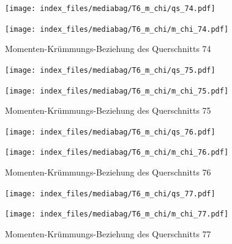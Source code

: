 \documentclass[
  11pt,
  letterpaper,
]{scrreprt}
\begin{document}
\begin{figure}[H]

\begin{minipage}{0.50\linewidth}
\texttt{[image: index\_files/mediabag/T6\_m\_chi/qs\_74.pdf]}\end{minipage}%
%
\begin{minipage}{0.50\linewidth}
\texttt{[image: index\_files/mediabag/T6\_m\_chi/m\_chi\_74.pdf]}\end{minipage}%

\caption{\label{fig-mchi_anhang}Momenten-Krümmungs-Beziehung des
Querschnitts 74}

\end{figure}%

\begin{figure}[H]

\begin{minipage}{0.50\linewidth}
\texttt{[image: index\_files/mediabag/T6\_m\_chi/qs\_75.pdf]}\end{minipage}%
%
\begin{minipage}{0.50\linewidth}
\texttt{[image: index\_files/mediabag/T6\_m\_chi/m\_chi\_75.pdf]}\end{minipage}%

\caption{\label{fig-mchi_anhang}Momenten-Krümmungs-Beziehung des
Querschnitts 75}

\end{figure}%

\begin{figure}[H]

\begin{minipage}{0.50\linewidth}
\texttt{[image: index\_files/mediabag/T6\_m\_chi/qs\_76.pdf]}\end{minipage}%
%
\begin{minipage}{0.50\linewidth}
\texttt{[image: index\_files/mediabag/T6\_m\_chi/m\_chi\_76.pdf]}\end{minipage}%

\caption{\label{fig-mchi_anhang}Momenten-Krümmungs-Beziehung des
Querschnitts 76}

\end{figure}%

\begin{figure}[H]

\begin{minipage}{0.50\linewidth}
\texttt{[image: index\_files/mediabag/T6\_m\_chi/qs\_77.pdf]}\end{minipage}%
%
\begin{minipage}{0.50\linewidth}
\texttt{[image: index\_files/mediabag/T6\_m\_chi/m\_chi\_77.pdf]}\end{minipage}%

\caption{\label{fig-mchi_anhang}Momenten-Krümmungs-Beziehung des
Querschnitts 77}

\end{figure}%
\end{document}
